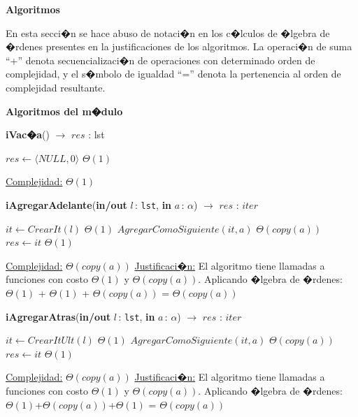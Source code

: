 \documentclass[a4paper,10pt]{article}
\let\TipoVariable=\texttt
\let\ModificadorArgumento=\textbf
\newcommand{\In}[2]{\ModificadorArgumento{in} \ensuremath{#1}\,: \TipoVariable{#2}\xspace}
\newcommand{\Inout}[2]{\ModificadorArgumento{in/out} \ensuremath{#1}\,: \TipoVariable{#2}\xspace}
\newenvironment{Algoritmos}{%
  \vspace*{2ex}%
  \noindent\textbf{\Large Algoritmos}%
  \vspace*{2ex}%
}{}
\newcommand{\Titulo}[1]{
  \vspace*{1ex}\par\noindent\textbf{\large #1}\par
}
\begin{document}
\begin{Algoritmos}

En esta secci�n se hace abuso de notaci�n en los c�lculos de �lgebra de �rdenes presentes en la justificaciones de los algoritmos. La operaci�n de suma ``+'' denota secuencializaci�n de operaciones con determinado orden de complejidad, y el s�mbolo de igualdad ``='' denota la pertenencia al orden de complejidad resultante.

\medskip
	
 \Titulo{Algoritmos del m�dulo}
  	\medskip
  
\begin{algorithm}[H]{\textbf{iVac�a}() $\to$ $res$ : lst}
    	\begin{algorithmic}[1]
			 \State $res \gets \langle NULL, 0 \rangle$ \Comment $\Theta(1)$

			\medskip
			\Statex \underline{Complejidad:} $\Theta(1)$
    	\end{algorithmic}
\end{algorithm}

\begin{algorithm}[H]{\textbf{iAgregarAdelante}(\Inout{l}{lst}, \In{a}{$\alpha$}) $\to$ $res$ : $iter$}
	\begin{algorithmic}
			 \State $it \gets CrearIt(l)$ 				\Comment $\Theta(1)$
			 \State $AgregarComoSiguiente(it, a)$	\Comment $\Theta(copy(a))$
			 \State $res \gets it$					\Comment $\Theta(1)$

			\medskip
			\Statex \underline{Complejidad:} $\Theta(copy(a))$
			\Statex \underline{Justificaci�n:} El algoritmo tiene llamadas a funciones con costo $\Theta(1)$ y $\Theta(copy(a))$. Aplicando �lgebra de �rdenes: \\ $\Theta(1)$ + $\Theta(1)$ + $\Theta(copy(a))$ = $\Theta(copy(a))$
    	\end{algorithmic}
\end{algorithm}


\begin{algorithm}[H]{\textbf{iAgregarAtras}(\Inout{l}{lst}, \In{a}{$\alpha$}) $\to$ $res$ : $iter$}
	\begin{algorithmic}[1]
			 \State $it \gets CrearItUlt(l)$	\Comment $\Theta(1)$
			 \State $AgregarComoSiguiente(it, a)$	\Comment $\Theta(copy(a))$
			 \State $res \gets it$	\Comment $\Theta(1)$

			\medskip
			\Statex \underline{Complejidad:} $\Theta(copy(a))$
			\Statex \underline{Justificaci�n:} El algoritmo tiene llamadas a funciones con costo $\Theta(1)$ y $\Theta(copy(a))$. Aplicando �lgebra de �rdenes:  $\Theta(1)$+$\Theta(copy(a))$+$\Theta(1)$ =  $\Theta(copy(a))$
    	\end{algorithmic}
\end{algorithm}
	


\end{Algoritmos}
\end{document}
